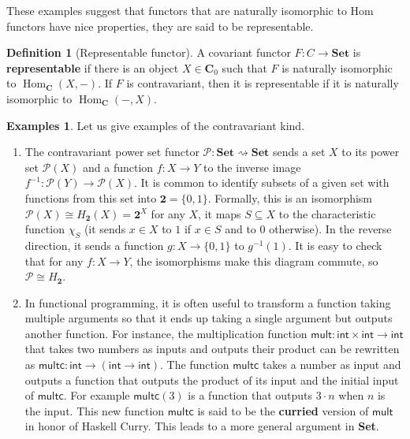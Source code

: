 \documentclass{article}
\theoremstyle{definition}
\newtheorem{defn}[thm]{Definition}
\newtheorem{exmps}[thm]{Examples}
\theoremstyle{remark}
\newcommand{\mP}{\mathcal{P}}
\DeclareMathOperator{\Hom}{Hom}
\begin{document}
These examples suggest that functors that are naturally isomorphic to Hom functors have nice properties, they are said to be representable.

\begin{defn}[Representable functor]
	 A covariant functor $F: C\rightarrow \textbf{Set}$ is \textbf{representable} if there is an object $X \in \mathbf{C}_0$ such that $F$ is naturally isomorphic to $\Hom_{\mathbf{C}}(X,-)$. If $F$ is contravariant, then it is representable if it is naturally isomorphic to $\Hom_{\mathbf{C}}(-,X)$.
\end{defn}
\begin{exmps}
	Let us give examples of the contravariant kind.
	\begin{enumerate}
		\item The contravariant power set functor $\mP: \textbf{Set} \rightsquigarrow \textbf{Set}$ sends a set $X$ to its power set $\mP(X)$ and a function $f:X\rightarrow Y$ to the inverse image $f^{-1}:\mP(Y) \rightarrow \mP(X)$. It is common to identify subsets of a given set with functions from this set into $\mathbf{2} = \{0,1\}$. Formally, this is an isomorphism $\mP(X) \cong H_{\mathbf{2}}(X) = \mathbf{2}^X$ for any $X$, it maps $S \subseteq X$ to the characteristic function $\chi_S$ (it sends $x \in X$ to $1$ if $x \in S$ and to $0$ otherwise). In the reverse direction, it sends a function $g:X\rightarrow \{0,1\}$ to $g^{-1}(1)$. It is easy to check that for any $f:X\rightarrow Y$, the isomorphisms make this diagram commute, so $\mP \cong H_{\mathbf{2}}$.
		\begin{figure}[h]
			\centering
		\end{figure}
		\item In functional programming, it is often useful to transform a function taking multiple arguments so that it ends up taking a single argument but outputs another function. For instance, the multiplication function $\textsf{mult}: \textsf{int} \times \textsf{int} \rightarrow \textsf{int}$ that takes two numbers as inputs and outputs their product can be rewritten as $\textsf{multc} : \textsf{int} \rightarrow (\textsf{int} \rightarrow \textsf{int})$. The function $\textsf{multc}$ takes a number as input and outputs a function that outputs the product of its input and the initial input of $\textsf{multc}$. For example $\textsf{multc}(3)$ is a function that outputs $3\cdot n$ when $n$ is the input. This new function $\textsf{multc}$ is said to be the \textbf{curried} version of $\textsf{mult}$ in honor of Haskell Curry. This leads to a more general argument in \textbf{Set}.
		

\end{enumerate}
\end{exmps}
\end{document}
